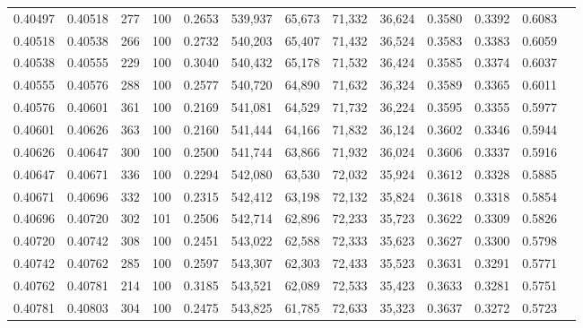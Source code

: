 \begin{tabular}{rrrrrrrrrrrrr}
0.40497 & 0.40518 &   277 & 100 &                                     0.2653 & 539,937 &  65,673 &  71,332 &  36,624 & 0.3580 & 0.3392 & 0.6083 \\
0.40518 & 0.40538 &   266 & 100 &                                     0.2732 & 540,203 &  65,407 &  71,432 &  36,524 & 0.3583 & 0.3383 & 0.6059 \\
0.40538 & 0.40555 &   229 & 100 &                                     0.3040 & 540,432 &  65,178 &  71,532 &  36,424 & 0.3585 & 0.3374 & 0.6037 \\
0.40555 & 0.40576 &   288 & 100 &                                     0.2577 & 540,720 &  64,890 &  71,632 &  36,324 & 0.3589 & 0.3365 & 0.6011 \\
0.40576 & 0.40601 &   361 & 100 &                                     0.2169 & 541,081 &  64,529 &  71,732 &  36,224 & 0.3595 & 0.3355 & 0.5977 \\
0.40601 & 0.40626 &   363 & 100 &                                     0.2160 & 541,444 &  64,166 &  71,832 &  36,124 & 0.3602 & 0.3346 & 0.5944 \\
0.40626 & 0.40647 &   300 & 100 &                                     0.2500 & 541,744 &  63,866 &  71,932 &  36,024 & 0.3606 & 0.3337 & 0.5916 \\
0.40647 & 0.40671 &   336 & 100 &                                     0.2294 & 542,080 &  63,530 &  72,032 &  35,924 & 0.3612 & 0.3328 & 0.5885 \\
0.40671 & 0.40696 &   332 & 100 &                                     0.2315 & 542,412 &  63,198 &  72,132 &  35,824 & 0.3618 & 0.3318 & 0.5854 \\
0.40696 & 0.40720 &   302 & 101 &                                     0.2506 & 542,714 &  62,896 &  72,233 &  35,723 & 0.3622 & 0.3309 & 0.5826 \\
0.40720 & 0.40742 &   308 & 100 &                                     0.2451 & 543,022 &  62,588 &  72,333 &  35,623 & 0.3627 & 0.3300 & 0.5798 \\
0.40742 & 0.40762 &   285 & 100 &                                     0.2597 & 543,307 &  62,303 &  72,433 &  35,523 & 0.3631 & 0.3291 & 0.5771 \\
0.40762 & 0.40781 &   214 & 100 &                                     0.3185 & 543,521 &  62,089 &  72,533 &  35,423 & 0.3633 & 0.3281 & 0.5751 \\
0.40781 & 0.40803 &   304 & 100 &                                     0.2475 & 543,825 &  61,785 &  72,633 &  35,323 & 0.3637 & 0.3272 & 0.5723 \\

\end{tabular}
